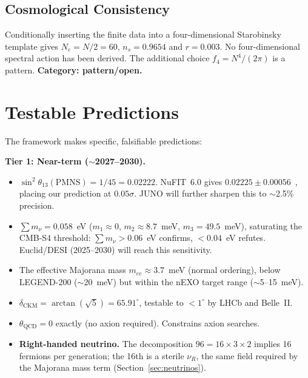 \documentclass[12pt,a4paper]{article}
\theoremstyle{definition}
\begin{document}
\subsection{Cosmological Consistency}
\label{sec:cosmo}

Conditionally inserting the finite data into a four-dimensional Starobinsky
template gives $N_e=N/2=60$, $n_s=0.9654$ and $r=0.003$.  No four-dimensional
spectral action has been derived.  The additional choice $f_4=N^4/(2\pi)$ is
a pattern.  \textbf{Category: pattern/open.}



\section{Testable Predictions}
\label{sec:predictions}

The framework makes specific, falsifiable predictions:

\textbf{Tier 1: Near-term ($\sim$2027--2030).}
\begin{itemize}
\item $\sin^2\theta_{13}(\text{PMNS}) = 1/45 = 0.02222$. NuFIT~6.0 gives $0.02225 \pm 0.00056$~\cite{nufit6}, placing our prediction at $0.05\sigma$. JUNO will further sharpen this to $\sim$2.5\% precision.
\item $\sum m_\nu = 0.058$~eV ($m_1 \approx 0$, $m_2 \approx 8.7$~meV, $m_3 = 49.5$~meV), saturating the CMB-S4 threshold: $\sum m_\nu > 0.06$~eV confirms, $< 0.04$~eV refutes.  Euclid/DESI (2025--2030) will reach this sensitivity.
\item The effective Majorana mass $m_{ee} \approx 3.7$~meV (normal ordering), below LEGEND-200 ($\sim$20~meV) but within the nEXO target range ($\sim$5--15~meV).
\item $\delta_{\text{CKM}} = \arctan(\sqrt{5}) = 65.91^\circ$, testable to $< 1^\circ$ by LHCb and Belle~II.
\item $\theta_{\text{QCD}} = 0$ exactly (no axion required). Constrains axion searches.
\item \textbf{Right-handed neutrino.} The decomposition $96 = 16 \times 3 \times 2$ implies 16 fermions per generation; the 16th is a sterile $\nu_R$, the same field required by the Majorana mass term (Section~\ref{sec:neutrinos}).
\end{itemize}
\end{document}
